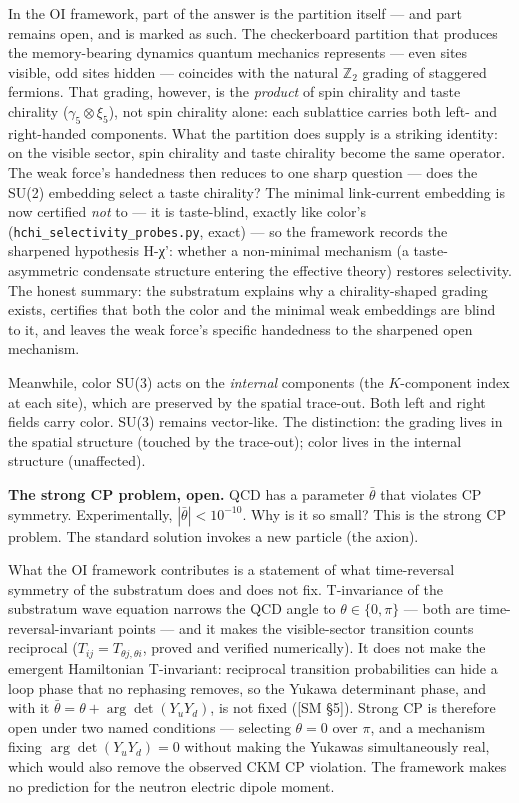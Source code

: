\documentclass[
]{article}
\begin{document}
In the OI framework, part of the answer is the partition itself --- and
part remains open, and is marked as such. The checkerboard partition
that produces the memory-bearing dynamics quantum mechanics represents
--- even sites visible, odd sites hidden --- coincides with the natural
\(\mathbb{Z}_2\) grading of staggered fermions. That grading, however,
is the \emph{product} of spin chirality and taste chirality
(\(\gamma_5 \otimes \xi_5\)), not spin chirality alone: each sublattice
carries both left- and right-handed components. What the partition does
supply is a striking identity: on the visible sector, spin chirality and
taste chirality become the same operator. The weak force's handedness
then reduces to one sharp question --- does the SU(2) embedding select a
taste chirality? The minimal link-current embedding is now certified
\emph{not} to --- it is taste-blind, exactly like color's
(\texttt{hchi\_selectivity\_probes.py}, exact) --- so the framework
records the sharpened hypothesis H-χ': whether a non-minimal mechanism
(a taste-asymmetric condensate structure entering the effective theory)
restores selectivity. The honest summary: the substratum explains why a
chirality-shaped grading exists, certifies that both the color and the
minimal weak embeddings are blind to it, and leaves the weak force's
specific handedness to the sharpened open mechanism.

Meanwhile, color SU(3) acts on the \emph{internal} components (the
\(K\)-component index at each site), which are preserved by the spatial
trace-out. Both left and right fields carry color. SU(3) remains
vector-like. The distinction: the grading lives in the spatial structure
(touched by the trace-out); color lives in the internal structure
(unaffected).

\textbf{The strong CP problem, open.} QCD has a parameter
\(\bar{\theta}\) that violates CP symmetry. Experimentally,
\(|\bar{\theta}| < 10^{-10}\). Why is it so small? This is the strong CP
problem. The standard solution invokes a new particle (the axion).

What the OI framework contributes is a statement of what time-reversal
symmetry of the substratum does and does not fix. T-invariance of the
substratum wave equation narrows the QCD angle to \(\theta\in\{0,\pi\}\)
--- both are time-reversal-invariant points --- and it makes the
visible-sector transition counts reciprocal
(\(T_{ij} = T_{\theta j,\theta i}\), proved and verified numerically).
It does not make the emergent Hamiltonian T-invariant: reciprocal
transition probabilities can hide a loop phase that no rephasing
removes, so the Yukawa determinant phase, and with it
\(\bar{\theta} = \theta + \arg\det(Y_u Y_d)\), is not fixed ({[}SM
§5{]}). Strong CP is therefore open under two named conditions ---
selecting \(\theta = 0\) over \(\pi\), and a mechanism fixing
\(\arg\det(Y_u Y_d) = 0\) without making the Yukawas simultaneously
real, which would also remove the observed CKM CP violation. The
framework makes no prediction for the neutron electric dipole moment.
\end{document}
